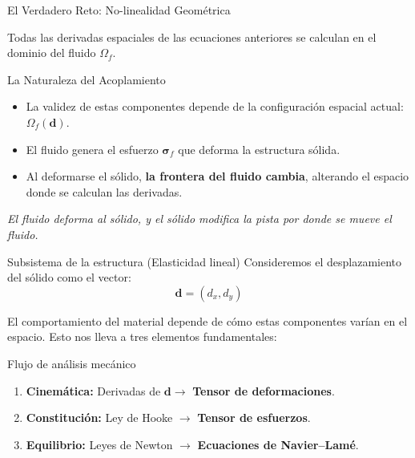\begin{frame}{El Verdadero Reto: No-linealidad Geométrica}
    
    Todas las derivadas espaciales de las ecuaciones anteriores se calculan en el dominio del fluido $\Omega_f$.
    
    \vspace{0.5cm}
    \begin{alertblock}{La Naturaleza del Acoplamiento}
        \begin{itemize}
            \item La validez de estas componentes depende de la configuración espacial actual: \textbf{$\Omega_f(\mathbf{d})$}.
            \item El fluido genera el esfuerzo $\boldsymbol{\sigma}_f$ que deforma la estructura sólida.
            \item Al deformarse el sólido, \textbf{la frontera del fluido cambia}, alterando el espacio donde se calculan las derivadas.
        \end{itemize}
    \end{alertblock}
    
    \vspace{0.4cm}
    \begin{center}
        \textit{El fluido deforma al sólido, y el sólido modifica la pista por donde se mueve el fluido.}
    \end{center}
\end{frame}

\begin{frame}{Subsistema de la estructura (Elasticidad lineal)}
Consideremos el desplazamiento del sólido como el vector:
\[
\mathbf{d} = (d_x, d_y)
\]

El comportamiento del material depende de cómo estas componentes varían en el espacio. Esto nos lleva a tres elementos fundamentales:

\begin{block}{Flujo de análisis mecánico}
\begin{enumerate}
    \item \textbf{Cinemática:} Derivadas de $\mathbf{d} \rightarrow$ \textbf{Tensor de deformaciones}.
    \item \textbf{Constitución:} Ley de Hooke $\rightarrow$ \textbf{Tensor de esfuerzos}.
    \item \textbf{Equilibrio:} Leyes de Newton $\rightarrow$ \textbf{Ecuaciones de Navier--Lamé}.
\end{enumerate}
\end{block}
\end{frame}

